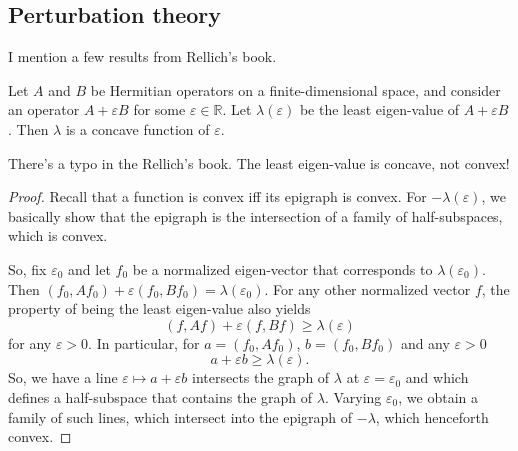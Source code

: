 \subsection{Perturbation theory}
I mention a few results from Rellich's \cite{rellich} book.
\begin{proposition}\label{p:conv_le}
Let $A$ and $B$ be Hermitian operators on a finite-dimensional space, and consider an operator $A + \varepsilon B$ for some $\varepsilon \in \mathbb R$. Let $\lambda(\varepsilon)$ be the least eigen-value of $A+\varepsilon B$. Then $\lambda$ is a concave function of $\varepsilon$.
\end{proposition}
There's a typo in the Rellich's book. The least eigen-value is concave, not convex!
\begin{proof}
Recall that a function is convex iff its epigraph is convex. For $-\lambda(\varepsilon)$, we basically show that the epigraph is the intersection of a family of half-subspaces, which is convex.

So, fix $\varepsilon_0$ and let $f_0$ be a normalized eigen-vector that corresponds to $\lambda(\varepsilon_0)$. Then $(f_0,Af_0) + \varepsilon (f_0, Bf_0) = \lambda(\varepsilon_0)$. For any other normalized vector $f$, the property of being the least eigen-value also yields
\[
(f,Af) + \varepsilon (f, Bf) \geq \lambda(\varepsilon)
\]
for any $\varepsilon > 0$. In particular, for $a = (f_0,Af_0)$, $b = (f_0,Bf_0)$ and any $\varepsilon > 0$
\[
a + \varepsilon b \geq \lambda(\varepsilon).
\]
So, we have a line $\varepsilon \mapsto a+\varepsilon b$ intersects the graph of $\lambda$ at $\varepsilon = \varepsilon_0$ and which defines a half-subspace that contains the graph of $\lambda$. Varying $\varepsilon_0$, we obtain a family of such lines, which intersect into the epigraph of $-\lambda$, which henceforth convex.
\end{proof}


